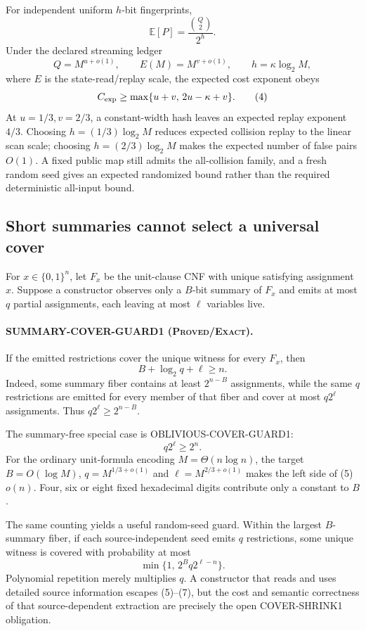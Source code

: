 \documentclass[11pt]{article}
\newcommand{\Exact}{\textsc{Proved/Exact}}
\begin{document}
For independent uniform $h$-bit fingerprints,
\[
       \mathbb E[P]=\frac{\binom Q2}{2^h}.                   \tag{3}
\]
Under the declared streaming ledger
\[
   Q=M^{u+o(1)},\qquad E(M)=M^{v+o(1)},\qquad
   h=\kappa\log_2 M,
\]
where $E$ is the state-read/replay scale, the expected cost exponent obeys
\[
       C_{\rm exp}\ge
       \max\{u+v,\,2u-\kappa+v\}.                           \tag{4}
\]
At $u=1/3,v=2/3$, a constant-width hash leaves an expected replay exponent
$4/3$.  Choosing $h=(1/3)\log_2M$ reduces expected collision replay to the
linear scan scale; choosing $h=(2/3)\log_2M$ makes the expected number of false
pairs $O(1)$.  A fixed public map still admits the all-collision family, and a
fresh random seed gives an expected randomized bound rather than the required
deterministic all-input bound.

\subsection{Short summaries cannot select a universal cover}

For $x\in\{0,1\}^n$, let $F_x$ be the unit-clause CNF with unique satisfying
assignment $x$.  Suppose a constructor observes only a $B$-bit summary of
$F_x$ and emits at most $q$ partial assignments, each leaving at most $\ell$
variables live.

\paragraph{SUMMARY-COVER-GUARD1 (\Exact).}
If the emitted restrictions cover the unique witness for every $F_x$, then
\[
                \boxed{B+\log_2 q+\ell\ge n}.               \tag{5}
\]
Indeed, some summary fiber contains at least $2^{n-B}$ assignments, while the
same $q$ restrictions are emitted for every member of that fiber and cover at
most $q2^\ell$ assignments.  Thus $q2^\ell\ge2^{n-B}$.

The summary-free special case is OBLIVIOUS-COVER-GUARD1:
\[
                q2^\ell\ge2^n.                              \tag{6}
\]
For the ordinary unit-formula encoding $M=\Theta(n\log n)$, the target
$B=O(\log M)$, $q=M^{1/3+o(1)}$ and $\ell=M^{2/3+o(1)}$ makes the left side of
(5) $o(n)$.  Four, six or eight fixed hexadecimal digits contribute only a
constant to $B$.

The same counting yields a useful random-seed guard.  Within the largest
$B$-summary fiber, if each source-independent seed emits $q$ restrictions,
some unique witness is covered with probability at most
\[
        \min\{1,\,2^Bq2^{\ell-n}\}.                          \tag{7}
\]
Polynomial repetition merely multiplies $q$.  A constructor that reads and
uses detailed source information escapes (5)--(7), but the cost and semantic
correctness of that source-dependent extraction are precisely the open
COVER-SHRINK1 obligation.
\end{document}
